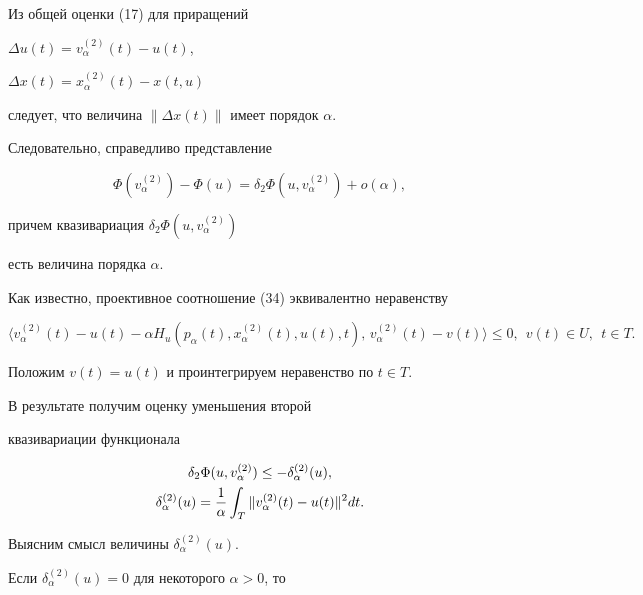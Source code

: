 Из общей оценки (17) для приращений


$\Delta u(t)=v_{\alpha}^{(2)}(t) - u(t)$,


$\Delta x(t)=x_{\alpha}^{(2)}(t) - x(t,u)$


следует, что величина $\| \Delta x(t)\|$ имеет порядок $\alpha$.





Следовательно, справедливо представление


\begin{equation}


\Phi(v_{\alpha}^{(2)}) - \Phi(u)=


\delta_{2} \Phi(u, v_{\alpha}^{(2)})+o(\alpha),


\end{equation}


причем квазивариация $\delta_{2} \Phi(u, v_{\alpha}^{(2)})$


есть величина порядка $\alpha$.





Как известно, проективное соотношение (34) эквивалентно неравенству


$$


\langle v_{\alpha}^{(2)}(t) - u(t) - \alpha H_{u}(p_{\alpha}(t),


x_{\alpha}^{(2)}(t), u(t), t),\, v_{\alpha}^{(2)}(t) - v(t)\rangle \leq 0,


\ \ v(t) \in U,\ \ t \in T.


$$


Положим $v(t)=u(t)$ и проинтегрируем неравенство по $t \in T$.


В результате получим оценку уменьшения второй


квазивариации функционала


\begin{gather}


\delta_{2} \Phi(u, v_{\alpha}^{(2)}) \leq -


\delta_{\alpha}^{(2)}(u),\\


\delta_{\alpha}^{(2)}(u)=\frac{1}{\alpha} \int_{T}


\| v_{\alpha}^{(2)}(t) - u(t)\|^{2} dt.\notag


\end{gather}


Выясним смысл величины $\delta_{\alpha}^{(2)}(u)$.


Если $\delta_{\alpha}^{(2)}(u)=0$ для некоторого $\alpha>0$, то


